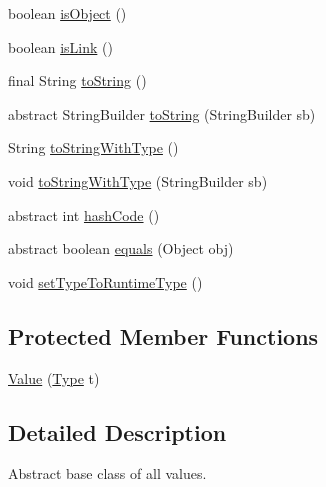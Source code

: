 \begin{DoxyCompactItemize}
\item 
boolean \hyperlink{classorg_1_1tzi_1_1use_1_1uml_1_1ocl_1_1value_1_1_value_ac18ed0fcc8fb9d0f5d6f71a786c907e4}{is\-Object} ()
\item 
boolean \hyperlink{classorg_1_1tzi_1_1use_1_1uml_1_1ocl_1_1value_1_1_value_a5664d51bd9a8de877a98ac115d32efb0}{is\-Link} ()
\item 
final String \hyperlink{classorg_1_1tzi_1_1use_1_1uml_1_1ocl_1_1value_1_1_value_acbfecdda5f2f8a5bdd349c4c1cafa67a}{to\-String} ()
\item 
abstract String\-Builder \hyperlink{classorg_1_1tzi_1_1use_1_1uml_1_1ocl_1_1value_1_1_value_adf73afebdae205fb249c805c113d8d73}{to\-String} (String\-Builder sb)
\item 
String \hyperlink{classorg_1_1tzi_1_1use_1_1uml_1_1ocl_1_1value_1_1_value_a6ac569f77d44c6e3c946d876da0584f8}{to\-String\-With\-Type} ()
\item 
void \hyperlink{classorg_1_1tzi_1_1use_1_1uml_1_1ocl_1_1value_1_1_value_a5bc755b4203f8a78599d1d3061bcaf9d}{to\-String\-With\-Type} (String\-Builder sb)
\item 
abstract int \hyperlink{classorg_1_1tzi_1_1use_1_1uml_1_1ocl_1_1value_1_1_value_a7eae691008133acf84755cc91a6f37ea}{hash\-Code} ()
\item 
abstract boolean \hyperlink{classorg_1_1tzi_1_1use_1_1uml_1_1ocl_1_1value_1_1_value_a36ad44ed201794f0c7a94799ac181a1a}{equals} (Object obj)
\item 
void \hyperlink{classorg_1_1tzi_1_1use_1_1uml_1_1ocl_1_1value_1_1_value_a63cb4c618a9072bcfada269b2682c716}{set\-Type\-To\-Runtime\-Type} ()
\end{DoxyCompactItemize}
\subsection*{Protected Member Functions}
\begin{DoxyCompactItemize}
\item 
\hyperlink{classorg_1_1tzi_1_1use_1_1uml_1_1ocl_1_1value_1_1_value_a3472f197dae945e5e98040488981bf8f}{Value} (\hyperlink{interfaceorg_1_1tzi_1_1use_1_1uml_1_1ocl_1_1type_1_1_type}{Type} t)
\end{DoxyCompactItemize}


\subsection{Detailed Description}
Abstract base class of all values.

